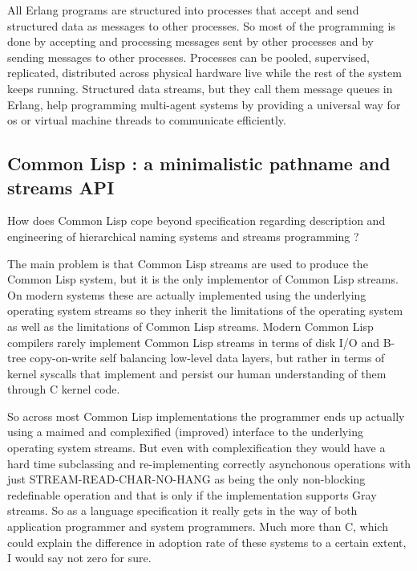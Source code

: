 \documentclass[sigconf]{acmart}
\begin{document}
All Erlang programs are structured into processes that accept and send structured data as messages to other processes. So most of the programming is done by accepting and processing messages sent by other processes and by sending messages to other processes. Processes can be pooled, supervised, replicated, distributed across physical hardware live while the rest of the system keeps running. Structured data streams, but they call them message queues in Erlang, help programming multi-agent systems by providing a universal way for os or virtual machine threads to communicate efficiently.

\subsection{Common Lisp : a minimalistic pathname and streams API}
How does Common Lisp cope beyond specification regarding description and engineering of hierarchical naming systems and streams programming ?

The main problem is that Common Lisp streams are used to produce the Common Lisp system, but it is the only implementor of Common Lisp streams. On modern systems these are actually implemented using the underlying operating system streams so they inherit the limitations of the operating system as well as the limitations of Common Lisp streams. Modern Common Lisp compilers rarely implement Common Lisp streams in terms of disk I/O and B-tree copy-on-write self balancing low-level data layers, but rather in terms of kernel syscalls that implement and persist our human understanding of them through C kernel code.

So across most Common Lisp implementations the programmer ends up actually using a maimed and complexified (improved) interface to the underlying operating system streams. But even with complexification they would have a hard time subclassing and re-implementing correctly asynchonous operations with just STREAM-READ-CHAR-NO-HANG as being the only non-blocking redefinable operation and that is only if the implementation supports Gray streams. So as a language specification it really gets in the way of both application programmer and system programmers. Much more than C, which could explain the difference in adoption rate of these systems to a certain extent, I would say not zero for sure.


\


\end{document}
